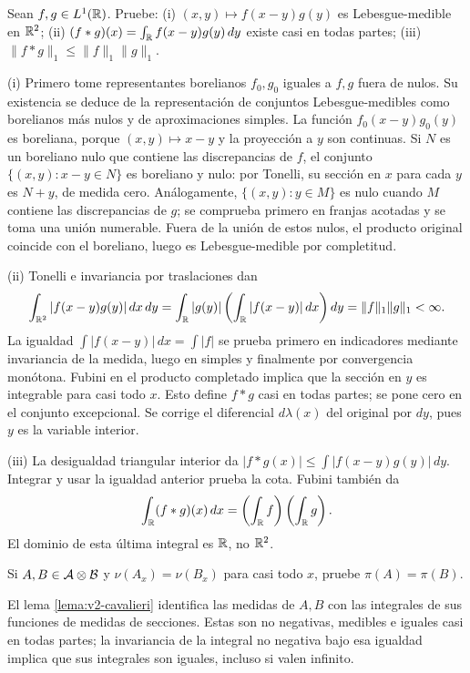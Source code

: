 \begin{ejercicio}\label{ej:v2-l11-6}
Sean $f,g\in L^1(\mathbb R)$. Pruebe: (i) $(x,y)\mapsto f(x-y)g(y)$ es Lebesgue-medible en $\mathbb R^2$; (ii) $(f*g)(x)=\int_\mathbb R f(x-y)g(y)\,dy$ existe casi en todas partes; (iii) $\|f*g\|_1\le\|f\|_1\|g\|_1$.
\end{ejercicio}
\begin{solucion}
(i) Primero tome representantes borelianos $f_0,g_0$ iguales a $f,g$ fuera de nulos. Su existencia se deduce de la representación de conjuntos Lebesgue-medibles como borelianos más nulos y de aproximaciones simples. La función $f_0(x-y)g_0(y)$ es boreliana, porque $(x,y)\mapsto x-y$ y la proyección a $y$ son continuas. Si $N$ es un boreliano nulo que contiene las discrepancias de $f$, el conjunto $\{(x,y):x-y\in N\}$ es boreliano y nulo: por Tonelli, su sección en $x$ para cada $y$ es $N+y$, de medida cero. Análogamente, $\{(x,y):y\in M\}$ es nulo cuando $M$ contiene las discrepancias de $g$; se comprueba primero en franjas acotadas y se toma una unión numerable. Fuera de la unión de estos nulos, el producto original coincide con el boreliano, luego es Lebesgue-medible por completitud.

(ii) Tonelli e invariancia por traslaciones dan
\[\int_{\mathbb R^2}|f(x-y)g(y)|\,dx\,dy
=\int_\mathbb R|g(y)|\left(\int_\mathbb R|f(x-y)|\,dx\right)dy
=\|f\|_1\|g\|_1<\infty.\]
La igualdad $\int|f(x-y)|\,dx=\int|f|$ se prueba primero en indicadores mediante invariancia de la medida, luego en simples y finalmente por convergencia monótona. Fubini en el producto completado implica que la sección en $y$ es integrable para casi todo $x$. Esto define $f*g$ casi en todas partes; se pone cero en el conjunto excepcional. Se corrige el diferencial $d\lambda(x)$ del original por $dy$, pues $y$ es la variable interior.

(iii) La desigualdad triangular interior da $|f*g(x)|\le\int|f(x-y)g(y)|\,dy$. Integrar y usar la igualdad anterior prueba la cota. Fubini también da
\[\int_\mathbb R(f*g)(x)\,dx=\left(\int_\mathbb R f\right)\left(\int_\mathbb R g\right).\]
El dominio de esta última integral es $\mathbb R$, no $\mathbb R^2$.
\end{solucion}

\begin{ejercicio}\label{ej:v2-l11-7}
Si $A,B\in\mathcal A\otimes\mathcal B$ y $\nu(A_x)=\nu(B_x)$ para casi todo $x$, pruebe $\pi(A)=\pi(B)$.
\end{ejercicio}
\begin{solucion}
El lema \ref{lema:v2-cavalieri} identifica las medidas de $A,B$ con las integrales de sus funciones de medidas de secciones. Estas son no negativas, medibles e iguales casi en todas partes; la invariancia de la integral no negativa bajo esa igualdad implica que sus integrales son iguales, incluso si valen infinito.
\end{solucion}

